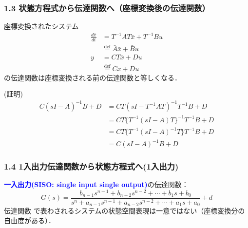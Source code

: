 \documentclass[10pt]{beamer}
\begin{document}
\begin{frame}[t]
\frametitle{1.3 状態方程式から伝達関数へ{\small （座標変換後の伝達関数）}}
座標変換されたシステム
\begin{align}
 \frac{d \bar{x}}{dt}
 &= T^{-1} A T \bar{x} + T^{-1} B u \nonumber \\
 & \stackrel{\text{def}}{=} \bar{A} \bar{x} + \bar{B} u \\
 y &= C T \bar{x} + D u \nonumber \\
   & \stackrel{\text{def}}{=} \bar{C} \bar{x} + \bar{D} u

\end{align}
の伝達関数は座標変換される前の伝達関数と等しくなる．

(証明)
\begin{align}
 \bar{C} (sI - \bar{A})^{-1} \bar{B} + \bar{D}
 &= CT (sI - T^{-1} A T )^{-1} T^{-1} B + D
\nonumber\\
 &= C T \{ T^{-1} (sI - A) T \}^{-1} T^{-1} B + D
\nonumber\\
 &= C T \{ T^{-1} (sI - A)^{-1} T \} T^{-1} B + D
\nonumber \\
 &= C (sI - A)^{-1} B + D
\end{align}
\end{frame}

\begin{frame}[t]
\frametitle{1.4 1入出力伝達関数から状態方程式へ(1入出力)}
\textcolor{blue}{\bf {一入出力}(SISO: single input single output)}の伝達関数：
\begin{equation}
 G(s) =
  \frac{b_{n-1} s^{n-1} + b_{n-2} s^{n-2} + \cdots + b_1 s + b_0}
  {s^n + a_{n-1} s^{n-1} + a_{n-2} s^{n-2} + \cdots + a_1 s + a_0}
  + d
  
\end{equation}
伝達関数 で表わされるシステムの状態空間表現は一意ではない（座標変換分の自由度がある）．
\end{frame}
\end{document}
